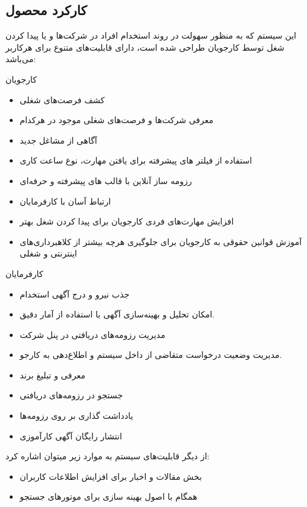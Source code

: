 \documentclass[12pt,svgnames,oneside]{book}
\newcounter{itemadded}
\let\LaTeXStandardEnumerateBegin\enumerate
\let\LaTeXStandardEnumerateEnd\endenumerate
\renewenvironment{enumerate}{%
\LaTeXStandardEnumerateBegin%
\setcounter{itemadded}{0}
}{%
\LaTeXStandardEnumerateEnd%
}%
\begin{document}
\subsection{کارکرد محصول}
این سیستم که به منظور سهولت در روند استخدام افراد در شرکت‌ها و یا پیدا کردن شغل توسط کارجویان طراحی شده‌ است، دارای قابلیت‌های متنوع برای هرکاربر می‌باشد:
\begin{enumerate}
\item
کارجویان
\begin{itemize}
\item
کشف فرصت‌های شغلی
\item
معرفی شرکت‌ها و فرصت‌های شغلی موجود در هرکدام
\item
آگاهی از مشاغل جدید
\item
استفاده از فیلتر های پیشرفته برای یافتن مهارت، نوع ساعت کاری
\item
رزومه ساز آنلاین با قالب های پیشرفته و حرفه‌ای
\item
ارتباط آسان با کارفرمایان
\item
افزایش  مهارت‌های فردی کارجویان برای پیدا کردن شغل بهتر
\item
آموزش قوانین حقوقی به کارجویان برای جلوگیری هرچه بیشتر از کلاهبرداری‌های اینترنتی و شغلی
\end{itemize}

\item
کارفرمایان
\begin{itemize}
\item
جذب نیرو و درج آگهی استخدام
\item
امکان تحلیل و بهینه‌سازی آگهی با استفاده از آمار دقیق.
\item
مدیریت رزومه‌های دریافتی در پنل شرکت
\item
مدیریت وضعیت درخواست متقاضی از داخل سیستم و اطلاع‌دهی به کارجو.
\item
معرفی و تبلیغ برند
\item
جستجو در رزومه‌های دریافتی
\item
یادداشت گذاری بر روی رزومه‌ها
\item
انتشار رایگان آگهی‌ کارآموزی
\end{itemize}

\end{enumerate}
از دیگر قابلیت‌های سیستم به موارد زیر میتوان اشاره کرد:
\begin{itemize}
\item
بخش مقالات و اخبار برای افزایش اطلاعات کاربران
\item
همگام با اصول بهینه سازی برای موتورهای جستجو
\end{itemize}
\end{document}
